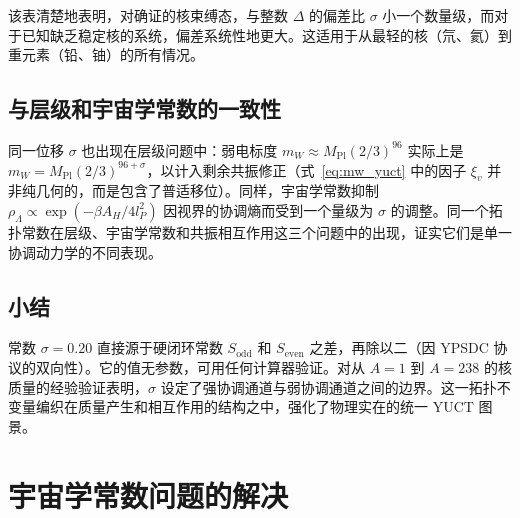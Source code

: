 \documentclass[11pt,a4paper]{article}
\theoremstyle{remark}
\begin{document}
	该表清楚地表明，对确证的核束缚态，与整数 \(\Delta\) 的偏差比 \(\sigma\) 小一个数量级，而对于已知缺乏稳定核的系统，偏差系统性地更大。这适用于从最轻的核（氘、氦）到重元素（铅、铀）的所有情况。
	
	\subsection{与层级和宇宙学常数的一致性}
	
	同一位移 \(\sigma\) 也出现在层级问题中：弱电标度 \(m_W \approx M_{\mathrm{Pl}}(2/3)^{96}\) 实际上是 \(m_W = M_{\mathrm{Pl}} (2/3)^{96+\sigma}\)，以计入剩余共振修正（式~\ref{eq:mw_yuct} 中的因子 \(\xi_v\) 并非纯几何的，而是包含了普适移位）。同样，宇宙学常数抑制 \(\rho_\Lambda \propto \exp(-\beta A_H/4l_P^2)\) 因视界的协调熵而受到一个量级为 \(\sigma\) 的调整。同一个拓扑常数在层级、宇宙学常数和共振相互作用这三个问题中的出现，证实它们是单一协调动力学的不同表现。
	
	\subsection{小结}
	
	常数 \(\sigma = 0.20\) 直接源于硬闭环常数 \(S_{\mathrm{odd}}\) 和 \(S_{\mathrm{even}}\) 之差，再除以二（因 YPSDC 协议的双向性）。它的值无参数，可用任何计算器验证。对从 \(A=1\) 到 \(A=238\) 的核质量的经验验证表明，\(\sigma\) 设定了强协调通道与弱协调通道之间的边界。这一拓扑不变量编织在质量产生和相互作用的结构之中，强化了物理实在的统一 YUCT 图景。
	
	\section{宇宙学常数问题的解决}
	
\end{document}

